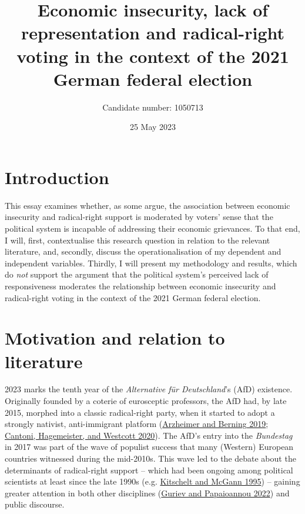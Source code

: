 \documentclass[
]{article}
\title{Economic insecurity, lack of representation and radical-right
voting in the context of the 2021 German federal election}
\author{Candidate number: 1050713}
\date{25 May 2023}
\begin{document}
\maketitle

\hypertarget{introduction}{%
\section{Introduction}\label{introduction}}

This essay examines whether, as some argue, the association between
economic insecurity and radical-right support is moderated by voters'
sense that the political system is incapable of addressing their
economic grievances. To that end, I will, first, contextualise this
research question in relation to the relevant literature, and, secondly,
discuss the operationalisation of my dependent and independent
variables. Thirdly, I will present my methodology and results, which do
\emph{not} support the argument that the political system's perceived
lack of responsiveness moderates the relationship between economic
insecurity and radical-right voting in the context of the 2021 German
federal election.

\hypertarget{motivation}{%
\section{Motivation and relation to literature}\label{motivation}}

2023 marks the tenth year of the \emph{Alternative für Deutschland}'s
(AfD) existence. Originally founded by a coterie of eurosceptic
professors, the AfD had, by late 2015, morphed into a classic
radical-right party, when it started to adopt a strongly nativist,
anti-immigrant platform
(\protect\hyperlink{ref-arzheimer_how_2019}{Arzheimer and Berning 2019};
\protect\hyperlink{ref-cantoni_persistence_2020}{Cantoni, Hagemeister,
and Westcott 2020}). The AfD's entry into the \emph{Bundestag} in 2017
was part of the wave of populist success that many (Western) European
countries witnessed during the mid-2010s. This wave led to the debate
about the determinants of radical-right support -- which had been
ongoing among political scientists at least since the late 1990s (e.g.
\protect\hyperlink{ref-kitschelt_radical_1995}{Kitschelt and McGann
1995}) -- gaining greater attention in both other disciplines
(\protect\hyperlink{ref-guriev_political_2022}{Guriev and Papaioannou
2022}) and public discourse.
\end{document}
